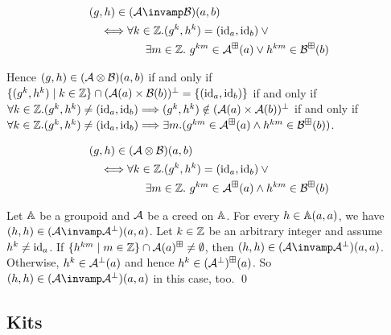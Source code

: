\begin{align*}
    & (g,h) \in (\creed \llpar \creedb)(a,b)
    \\ &
    \quad\Longleftrightarrow
    \forall k \in \Int. (g^k, h^k) = (\ident_a, \ident_b) \vee {}
    \\ &
    \quad\qquad\qquad \exists m \in \Int.\ g^{km} \in \creed^{\boxplus}(a) \vee h^{km} \in \creedb^
    {\boxplus}(b)
\end{align*}

Hence \( (g, h) \in (\mathcal{A} \otimes \mathcal{B})(a,b) \) if and only if \( \{ (g^k, h^k) \mid k \in \mathbb{Z} \} \cap (\mathcal{A}(a) \times \mathcal{B}(b))^\bot = \{ (\mathrm{id}_a, \mathrm{id}_b) \} \) if and only if \( \forall k \in \mathbb{Z}. (g^k, h^k) \neq (\mathrm{id}_a, \mathrm{id}_b) \Longrightarrow (g^k, h^k) \notin (\mathcal{A}(a) \times \mathcal{A}(b))^\bot \) if and only if \( \forall k \in \mathbb{Z}. (g^k, h^k) \neq (\mathrm{id}_a, \mathrm{id}_b) \Longrightarrow \exists m. (g^{km} \in \mathcal{A}^\boxplus(a) \wedge h^{km} \in \mathcal{B}^\boxplus(b)) \).

\begin{align*}
    & (g,h) \in (\mathcal{A} \otimes \mathcal{B})(a,b)
    \\ &
    \quad\Longleftrightarrow
    \forall k \in \mathbb{Z}. (g^k, h^k) = (\mathrm{id}_a, \mathrm{id}_b) \vee {}
    \\ &
    \quad\qquad\qquad \exists m \in \mathbb{Z}.\ g^{km} \in \mathcal{A}^{\boxplus}(a) \wedge h^{km} \in \mathcal{B}^
    {\boxplus}(b)
\end{align*}

\begin{example}
    Let \( \mathbb{A} \) be a groupoid and \( \mathcal{A} \) be a creed on \( \mathbb{A} \).
    For every \( h \in \mathbb{A}(a,a) \), we have \( (h,h) \in (\creed \llpar \creed^{\bot})(a,a) \).
    Let \( k \in \mathbb{Z} \) be an arbitrary integer and assume \( h^k \neq \mathrm{id}_a \).
    If \( \{ h^{km} \mid m \in \mathbb{Z} \} \cap \mathcal{A}(a)^\boxplus \neq \emptyset \), then \( (h,h) \in (\creed \llpar \creed^{\bot})(a,a) \).
    Otherwise, \( h^{k} \in \mathcal{A}^\bot(a) \) and hence \( h^k \in (\mathcal{A}^\bot)^\boxplus(a) \).
    So \( (h,h) \in (\creed \llpar \creed^{\bot})(a,a) \) in this case, too.
    \qed
\end{example}


\subsection{Kits}

